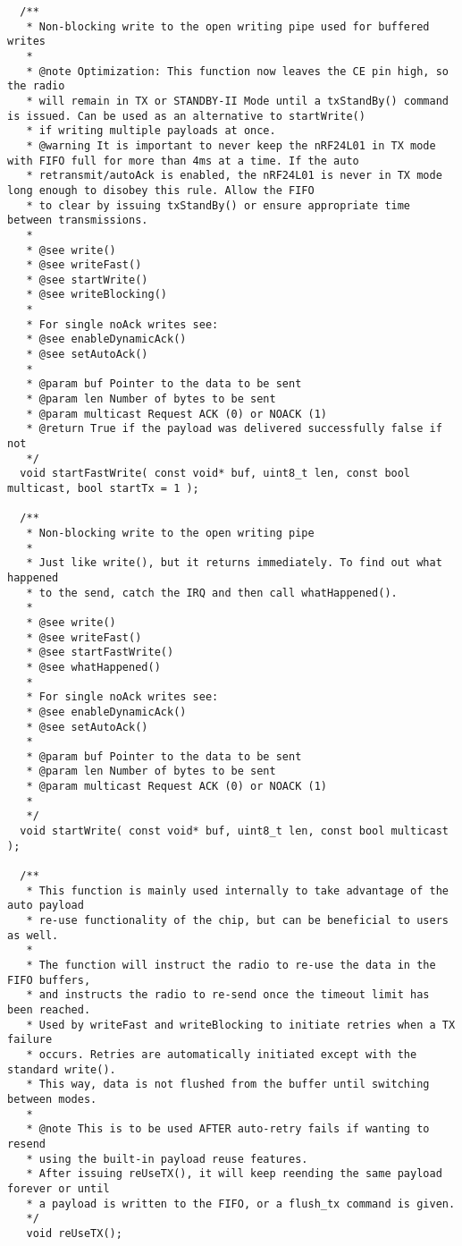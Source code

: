 \documentclass{article}
\begin{document}
\begin{itemize}
\begin{enumerate}
\begin{enumerate}
\begin{lstlisting}
  /**
   * Non-blocking write to the open writing pipe used for buffered writes
   *
   * @note Optimization: This function now leaves the CE pin high, so the radio
   * will remain in TX or STANDBY-II Mode until a txStandBy() command is issued. Can be used as an alternative to startWrite()
   * if writing multiple payloads at once.
   * @warning It is important to never keep the nRF24L01 in TX mode with FIFO full for more than 4ms at a time. If the auto
   * retransmit/autoAck is enabled, the nRF24L01 is never in TX mode long enough to disobey this rule. Allow the FIFO
   * to clear by issuing txStandBy() or ensure appropriate time between transmissions.
   *
   * @see write()
   * @see writeFast()
   * @see startWrite()
   * @see writeBlocking()
   *
   * For single noAck writes see:
   * @see enableDynamicAck()
   * @see setAutoAck()
   *
   * @param buf Pointer to the data to be sent
   * @param len Number of bytes to be sent
   * @param multicast Request ACK (0) or NOACK (1)
   * @return True if the payload was delivered successfully false if not
   */
  void startFastWrite( const void* buf, uint8_t len, const bool multicast, bool startTx = 1 );

  /**
   * Non-blocking write to the open writing pipe
   *
   * Just like write(), but it returns immediately. To find out what happened
   * to the send, catch the IRQ and then call whatHappened().
   *
   * @see write()
   * @see writeFast()
   * @see startFastWrite()
   * @see whatHappened()
   *
   * For single noAck writes see:
   * @see enableDynamicAck()
   * @see setAutoAck()
   *
   * @param buf Pointer to the data to be sent
   * @param len Number of bytes to be sent
   * @param multicast Request ACK (0) or NOACK (1)
   *
   */
  void startWrite( const void* buf, uint8_t len, const bool multicast );
  
  /**
   * This function is mainly used internally to take advantage of the auto payload
   * re-use functionality of the chip, but can be beneficial to users as well.
   *
   * The function will instruct the radio to re-use the data in the FIFO buffers,
   * and instructs the radio to re-send once the timeout limit has been reached.
   * Used by writeFast and writeBlocking to initiate retries when a TX failure
   * occurs. Retries are automatically initiated except with the standard write().
   * This way, data is not flushed from the buffer until switching between modes.
   *
   * @note This is to be used AFTER auto-retry fails if wanting to resend
   * using the built-in payload reuse features.
   * After issuing reUseTX(), it will keep reending the same payload forever or until
   * a payload is written to the FIFO, or a flush_tx command is given.
   */
   void reUseTX();


\end{lstlisting}
\end{enumerate}
\end{enumerate}
\end{itemize}
\end{document}
